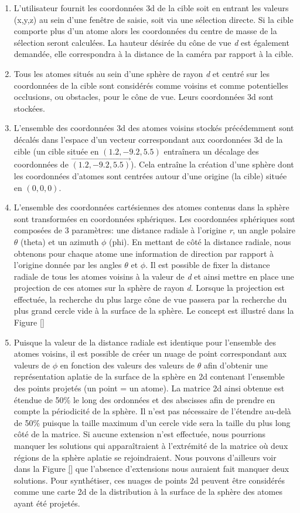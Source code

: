\begin{enumerate}
	\item L'utilisateur fournit les coordonnées 3d de la cible soit en entrant les valeurs (x,y,z) au sein d'une fenêtre de saisie, soit via une sélection directe. Si la cible comporte plus d'un atome alors les coordonnées du centre de masse de la sélection seront calculées. La hauteur désirée du cône de vue \textit{d} est également demandée, elle correspondra à la distance de la caméra par rapport à la cible.
	\item Tous les atomes situés au sein d'une sphère de rayon \textit{d} et centré sur les coordonnées de la cible sont considérés comme voisins et comme potentielles occlusions, ou obstacles, pour le cône de vue. Leurs coordonnées 3d sont stockées.
	\item L'ensemble des coordonnées 3d des atomes voisins stockés précédemment sont décalés dans l'espace d'un vecteur correspondant aux coordonnées 3d de la cible (un cible située en $(1.2,-9.2,5.5)$ entraînera un décalage des coordonnées de $\overrightarrow{(1.2,-9.2,5.5)}$). Cela entraîne la création d'une sphère dont les coordonnées d'atomes sont centrées autour d'une origine (la cible) située en $(0,0,0)$.
	\item L'ensemble des coordonnées cartésiennes des atomes contenus dans la sphère sont transformées en coordonnées sphériques. Les coordonnées sphériques sont composées de 3 paramètres: une distance radiale à l'origine \textit{r}, un angle polaire $\theta$ (theta) et un azimuth $\phi$ (phi). En mettant de côté la distance radiale, nous obtenons pour chaque atome une information de direction par rapport à l'origine donnée par les angles $\theta$ et $\phi$. Il est possible de fixer la distance radiale de tous les atomes voisins à la valeur de \textit{d} et ainsi mettre en place une projection de ces atomes sur la sphère de rayon \textit{d}. Lorsque la projection est effectuée, la recherche du plus large cône de vue passera par la recherche du plus grand cercle vide à la surface de la sphère. Le concept est illustré dans la Figure \ref{}
	\item Puisque la valeur de la distance radiale est identique pour l'ensemble des atomes voisins, il est possible de créer un nuage de point correspondant aux valeurs de $\phi$ en fonction des valeurs des valeurs de $\theta$ afin d'obtenir une représentation aplatie de la surface de la sphère en 2d contenant l'ensemble des points projetés (un point = un atome). La matrice 2d ainsi obtenue est étendue de 50\% le long des ordonnées et des abscisses afin de prendre en compte la périodicité de la sphère. Il n'est pas nécessaire de l'étendre au-delà de 50\% puisque la taille maximum d'un cercle vide sera la taille du plus long côté de la matrice. Si aucune extension n'est effectuée, nous pourrions manquer les solutions qui apparaîtraient à l'extrémité de la matrice où deux régions de la sphère aplatie se rejoindraient. Nous pouvons d'ailleurs voir dans la Figure \ref{} que l'absence d'extensions nous auraient fait manquer deux solutions. Pour synthétiser, ces nuages de points 2d peuvent être considérés comme une carte 2d de la distribution à la surface de la sphère des atomes ayant été projetés.

\end{enumerate}
